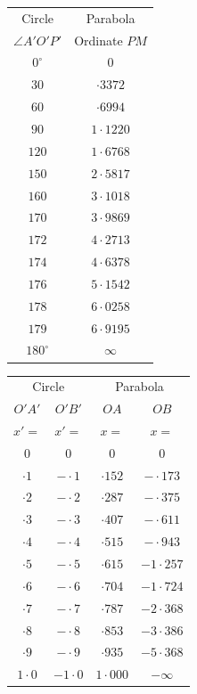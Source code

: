 \documentclass[11pt]{article}
\begin{document}
\begin{center}
\begin{tabular}{|c|c|}
\hline
Circle & Parabola \\
$\angle A'O'P'$ & Ordinate $PM$ \\
\hline
$0^{\circ}$ & $0$ \\
$30$ & $\cdot 3372$ \\
$60$ & $\cdot 6994$ \\
$90$ & $1\cdot 1220$ \\
$120$ & $1\cdot 6768$ \\
$150$ & $2\cdot 5817$ \\
$160$ & $3\cdot 1018$ \\
$170$ & $3\cdot 9869$ \\
$172$ & $4\cdot 2713$ \\
$174$ & $4\cdot 6378$ \\
$176$ & $5\cdot 1542$ \\
$178$ & $6\cdot 0258$ \\
$179$ & $6\cdot 9195$ \\
$180^{\circ}$ & $\infty$ \\
\hline
\end{tabular}
\qquad
\begin{tabular}{|cc|cc|}
\hline
\multicolumn{2}{|c|}{Circle} & \multicolumn{2}{c|}{Parabola} \\
$O'A'$ & $O'B'$ & $OA$ & $OB$ \\
$x'=$ & $x'=$ & $x=$ & $x=$ \\
\hline
$0$ & $0$ & $0$ & $0$ \\
$\cdot 1$ & $-\cdot 1$ & $\cdot 152$ & $-\cdot 173$ \\
$\cdot 2$ & $-\cdot 2$ & $\cdot 287$ & $-\cdot 375$ \\
$\cdot 3$ & $-\cdot 3$ & $\cdot 407$ & $-\cdot 611$ \\
$\cdot 4$ & $-\cdot 4$ & $\cdot 515$ & $-\cdot 943$ \\
$\cdot 5$ & $-\cdot 5$ & $\cdot 615$ & $-1\cdot 257$ \\
$\cdot 6$ & $-\cdot 6$ & $\cdot 704$ & $-1\cdot 724$ \\
$\cdot 7$ & $-\cdot 7$ & $\cdot 787$ & $-2\cdot 368$ \\
$\cdot 8$ & $-\cdot 8$ & $\cdot 853$ & $-3\cdot 386$ \\
$\cdot 9$ & $-\cdot 9$ & $\cdot 935$ & $-5\cdot 368$ \\
$1\cdot 0$ & $-1\cdot 0$ & $1\cdot 000$ & $-\infty$ \\
\hline
\end{tabular}
\end{center}
\end{document}
